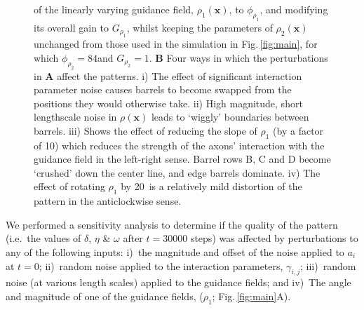 \documentclass[9pt,lineno]{elife}
\newcommand{\MPthreeSens}[1]{\textcolor{revgblack}{#1}}
\newcommand{\mb}[1]{\mathbf{#1}}
\begin{document}
\begin{figure}
\begin{fullwidth}
{{        of the linearly varying guidance field, $\rho_1(\mb{x})$, to $\phi_{\rho_1}$,
        and modifying its overall gain to $G_{\rho_1}$, whilst keeping the
        parameters of $\rho_2(\mb{x})$
        unchanged from those used in the simulation in
        Fig.\,\ref{fig:main}, for which
        $\phi_{\rho_2}=84$\textdegree and $G_{\rho_2}=1$.
        \textbf{B} Four ways in which the perturbations in \textbf{A} affect
        the patterns. i) The effect of significant interaction parameter noise
        causes barrels to become swapped from the positions they would
        otherwise take. ii) High magnitude, short lengthscale noise in
        $\rho(\mb{x})$ leads to `wiggly' boundaries between barrels. iii)
        Shows the effect of reducing the slope of $\rho_1$ (by a factor of 10)
        which reduces the strength of the axons' interaction with the guidance
        field in the left-right sense. Barrel rows B, C and D become `crushed'
        down the center line, and edge barrels dominate. iv) The effect of
        rotating $\rho_1$ by 20\textdegree~is a relatively mild distortion of
        the pattern in the anticlockwise sense.
      }
    }
    \label{fig:sens}
  \end{fullwidth}
\end{figure}

\MPthreeSens{We performed a sensitivity analysis to determine if the quality
  of the pattern (i.e.~the values of $\delta$, $\eta$ \& $\omega$ after
  $t=30000$ steps) was affected by perturbations to any of the following
  inputs:
%
  i)~the magnitude and offset of the noise applied to $a_i$ at $t=0$;
%
  ii)~random noise applied to the interaction parameters, $\gamma_{i,j}$;
%
  iii)~random noise (at various length scales) applied to the guidance fields;
%
  and
%
  iv)~The angle and magnitude of one of the guidance fields, ($\rho_1$;
  Fig.\,\ref{fig:main}A).
}
\end{document}
